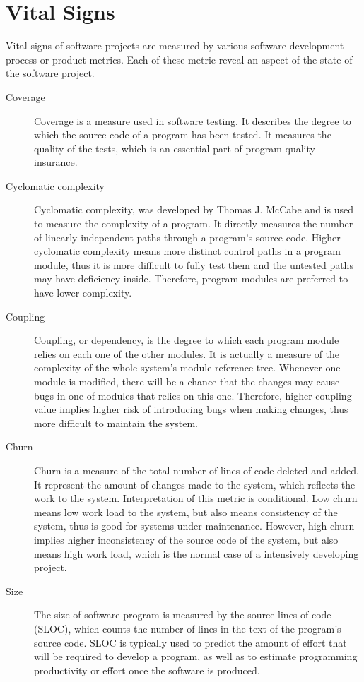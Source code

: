 \section{Vital Signs}
\label{vitalSign}

Vital signs of software projects are measured by various software development process or product metrics. Each of these metric reveal an aspect of the state of the software project.
\begin{description}
\item[Coverage] 
Coverage is a measure used in software testing. It describes the degree to which the source code of a program has been tested. It measures the quality of the tests, which is an essential part of program quality insurance.
\item[Cyclomatic complexity] 
Cyclomatic complexity, was developed by Thomas J. McCabe and is used to measure the complexity of a program. It directly measures the number of linearly independent paths through a program's source code.\cite{mccabe:complexity} Higher cyclomatic complexity means more distinct control paths in a program module, thus it is more difficult to fully test them and the untested paths may have deficiency inside. Therefore, program modules are preferred to have lower complexity.
\item[Coupling] 
Coupling, or dependency, is the degree to which each program module relies on each one of the other modules.\cite{wiki:coupling} It is actually a measure of the complexity of the whole system's module reference tree. Whenever one module is modified, there will be a chance that the changes may cause bugs in one of modules that relies on this one. Therefore, higher coupling value implies higher risk of introducing bugs when making changes, thus more difficult to maintain the system.
\item[Churn] 
Churn is a measure of the total number of lines of code deleted and added. It represent the amount of changes made to the system, which reflects the work to the system. Interpretation of this metric is conditional. Low churn means low work load to the system, but also means consistency of the system, thus is good for systems under maintenance. However, high churn implies higher inconsistency of the source code of the system, but also means high work load, which is the normal case of a intensively developing project.
\item[Size] 
The size of software program is measured by the source lines of code (SLOC), which counts the number of lines in the text of the program's source code. SLOC is typically used to predict the amount of effort that will be required to develop a program, as well as to estimate programming productivity or effort once the software is produced.

\end{description}
